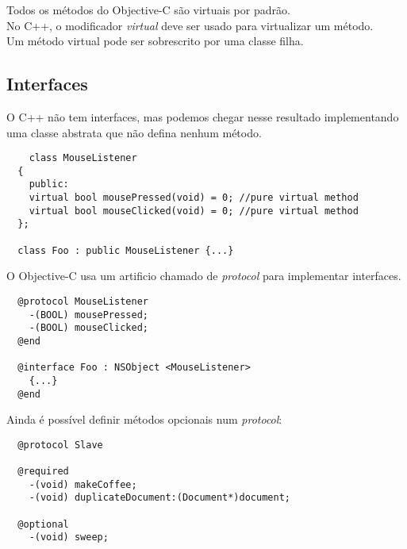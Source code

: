 \documentclass[brazil]{beamer}
\begin{document}
\begin{frame}
  Todos os métodos do Objective-C são virtuais por padrão. \\
  No C++, o modificador \textit{virtual} deve ser usado para virtualizar um método. \\
  Um método virtual pode ser sobrescrito por uma classe filha.
\end{frame}

\subsection{Interfaces}

\begin{frame}[fragile]
  O C++ não tem interfaces, mas podemos chegar nesse resultado implementando uma classe abstrata que não defina nenhum método. \\
    \lstset{language=C++,basicstyle=\scriptsize}
  \begin{lstlisting}
    class MouseListener
  {
    public:
    virtual bool mousePressed(void) = 0; //pure virtual method
    virtual bool mouseClicked(void) = 0; //pure virtual method
  };
  
  class Foo : public MouseListener {...}
  \end{lstlisting}
\end{frame}

\begin{frame}[fragile]
  O Objective-C usa um artificio chamado de \textit{protocol} para implementar interfaces.
      \lstset{language=C++,basicstyle=\scriptsize}
  \begin{lstlisting}
  @protocol MouseListener
    -(BOOL) mousePressed;
    -(BOOL) mouseClicked;
  @end
  
  @interface Foo : NSObject <MouseListener> 
    {...}
  @end
  \end{lstlisting}
\end{frame}

\begin{frame}[fragile]
  Ainda é possível definir métodos opcionais num \textit{protocol}:
        \lstset{language=C++,basicstyle=\scriptsize}
  \begin{lstlisting}
  @protocol Slave
  
  @required
    -(void) makeCoffee;
    -(void) duplicateDocument:(Document*)document;
  
  @optional
    -(void) sweep;

  \end{lstlisting}
\end{frame}
\end{document}
